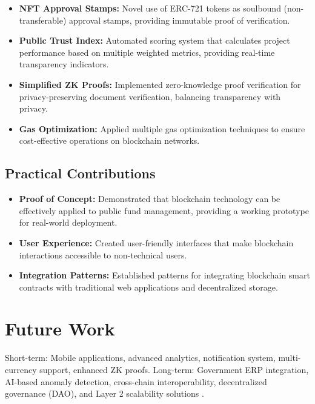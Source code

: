 \documentclass[12pt,a4wide]{report}
\theoremstyle{plain}
\theoremstyle{definition}
\theoremstyle{remark}
\begin{document}
\begin{itemize}
    \item \textbf{NFT Approval Stamps:} Novel use of ERC-721 \cite{erc721} tokens as soulbound (non-transferable) approval stamps, providing immutable proof of verification.
    
    \item \textbf{Public Trust Index:} Automated scoring system that calculates project performance based on multiple weighted metrics, providing real-time transparency indicators.
    
    \item \textbf{Simplified ZK Proofs:} Implemented zero-knowledge proof verification for privacy-preserving document verification, balancing transparency with privacy.
    
    \item \textbf{Gas Optimization:} Applied multiple gas optimization techniques to ensure cost-effective operations on blockchain networks.
\end{itemize}

\subsection{Practical Contributions}

\begin{itemize}
    \item \textbf{Proof of Concept:} Demonstrated that blockchain technology can be effectively applied to public fund management, providing a working prototype for real-world deployment.
    
    \item \textbf{User Experience:} Created user-friendly interfaces that make blockchain interactions accessible to non-technical users.
    
    \item \textbf{Integration Patterns:} Established patterns for integrating blockchain smart contracts with traditional web applications and decentralized storage.
\end{itemize}

\section{Future Work}

Short-term: Mobile applications, advanced analytics, notification system, multi-currency support, enhanced ZK proofs. Long-term: Government ERP integration, AI-based anomaly detection, cross-chain interoperability, decentralized governance (DAO), and Layer 2 scalability solutions \cite{polygon}.
\end{document}
